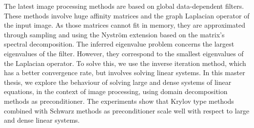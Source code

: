 The latest image processing methods are based on global data-dependent filters.
These methods involve huge affinity matrices and the graph Laplacian operator of the input image.
As those matrices cannot fit in memory, they are approximated through sampling and using the Nystr\"om extension based on the matrix's spectral decomposition.
The inferred eigenvalue problem concerns the largest eigenvalues of the filter.
However, they correspond to the smallest eigenvalues of the Laplacian operator.
To solve this, we use the inverse iteration method, which has a better convergence rate, but involves solving linear systems.
In this master thesis, we explore the behaviour of solving large and dense systems of linear equations, in the context of image processing, using domain decomposition methods as preconditioner.
The experiments show that Krylov type methods combined with Schwarz methods as preconditioner scale well with respect to large and dense linear systems.
